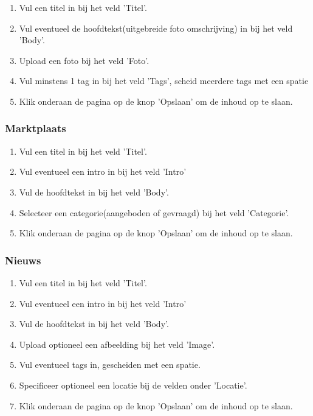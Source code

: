 \begin{enumerate}
\item Vul een titel in bij het veld 'Titel'.
\item Vul eventueel de hoofdtekst(uitgebreide foto omschrijving) in bij het veld 'Body'.
\item Upload een foto bij het veld 'Foto'.
\item Vul minstens 1 tag in bij het veld 'Tags', scheid meerdere tags met een spatie
\item Klik onderaan de pagina op de knop 'Opslaan' om de inhoud op te slaan.
\end{enumerate}

\subsubsection{Marktplaats}\label{marktplaats}

\begin{enumerate}
\item Vul een titel in bij het veld 'Titel'.
\item Vul eventueel een intro in bij het veld 'Intro'
\item Vul de hoofdtekst in bij het veld 'Body'.
\item Selecteer een categorie(aangeboden of gevraagd) bij het veld 'Categorie'.
\item Klik onderaan de pagina op de knop 'Opslaan' om de inhoud op te slaan.
\end{enumerate}

\subsubsection{Nieuws}\label{nieuws}

\begin{enumerate}
\item Vul een titel in bij het veld 'Titel'.
\item Vul eventueel een intro in bij het veld 'Intro'
\item Vul de hoofdtekst in bij het veld 'Body'.
\item Upload optioneel een afbeelding bij het veld 'Image'.
\item Vul eventueel tags in, gescheiden met een spatie.
\item Specificeer optioneel een locatie bij de velden onder 'Locatie'.
\item Klik onderaan de pagina op de knop 'Opslaan' om de inhoud op te slaan.
\end{enumerate}

